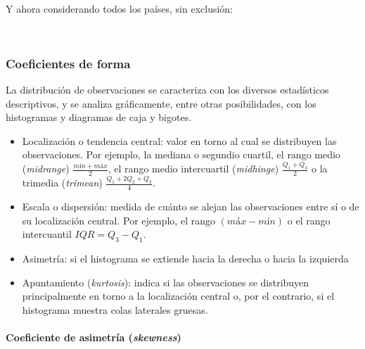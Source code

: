 \documentclass[11pt]{article}
\providecommand{\tightlist}{%
      \setlength{\itemsep}{0pt}\setlength{\parskip}{0pt}}
\begin{document}
    \begin{center}
    \end{center}
    { \hspace*{\fill} \\}
    
    Y ahora considerando todos los países, sin exclusión:

    \begin{center}
    \end{center}
    { \hspace*{\fill} \\}
    
    \subsubsection*{Coeficientes de forma}\label{coeficientes-de-forma}

La distribución de observaciones se caracteriza con los diversos
estadísticos descriptivos, y se analiza gráficamente, entre otras
posibilidades, con los histogramas y diagramas de caja y bigotes.

\begin{itemize}
\tightlist
\item
  Localización o tendencia central: valor en torno al cual se
  distribuyen las observaciones. Por ejemplo, la mediana o segundio
  cuartil, el rango medio (\emph{midrange}) \(\frac{mín + máx}{2}\), el
  rango medio intercuartil (\emph{midhinge}) \(\frac{Q_1 + Q_3}{2}\) o
  la trimedia (\emph{trimean}) \(\frac{Q_1 + 2Q_2 + Q_3}{4}\).
\item
  Escala o dispersión: medida de cuánto se alejan las observaciones
  entre sí o de su localización central. Por ejemplo, el rango
  \(\left(máx - mín\right)\) o el rango intercuantil
  \(IQR = Q_3 - Q_1\).
\item
  Asimetría: si el histograma se extiende hacia la derecha o hacia la
  izquierda
\item
  Apuntamiento (\emph{kurtosis}): indica si las observaciones se
  distribuyen principalmente en torno a la localización central o, por
  el contrario, si el histograma muestra colas laterales gruesas.
\end{itemize}

    \paragraph{\texorpdfstring{Coeficiente de asimetría
(\emph{skewness})}{Coeficiente de asimetría (skewness)}}\label{coeficiente-de-asimetruxeda-skewness}
\end{document}
